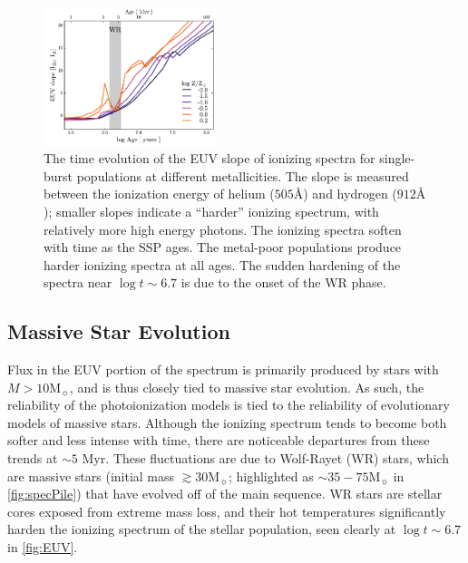 \documentclass[trackchanges, twocolumn, tighten]{aastex61}
\newcommand{\Fig}[1]{\autoref{fig:#1}}
\newcommand\Msun{\ensuremath{\mathrm{M_{\sun}}}}
\newcommand{\ang}{\ensuremath{\mbox{\AA}}}
\begin{document}
\begin{figure}
  \begin{centering}
    \includegraphics[width=0.45\textwidth]{f3.pdf}
    \caption{The time evolution of the EUV slope of ionizing spectra for single-burst populations at different metallicities. The slope is measured between the ionization energy of helium ($505\ang$) and hydrogen ($912\ang$); smaller slopes indicate a ``harder'' ionizing spectrum, with relatively more high energy photons. The ionizing spectra soften with time as the SSP ages. The metal-poor populations produce harder ionizing spectra at all ages. The sudden hardening of the spectra near $\log t \sim 6.7$ is due to the onset of the WR phase.}
    \label{fig:EUV}
  \end{centering}
\end{figure}

\subsection{Massive Star Evolution}\label{sec:spectra:stars}

Flux in the EUV portion of the spectrum is primarily produced by stars with $M > 10\Msun$, and is thus closely tied to massive star evolution. As such, the reliability of the photoionization models is tied to the reliability of evolutionary models of massive stars. Although the ionizing spectrum tends to become both softer and less intense with time, there are noticeable departures from these trends at ${\sim}5$ Myr. These fluctuations are due to Wolf-Rayet (WR) stars, which are massive stars (initial mass $\gtrsim 30\Msun$; highlighted as $\sim 35-75 \Msun$ in \Fig{specPile}) that have evolved off of the main sequence. WR stars are stellar cores exposed from extreme mass loss, and their hot temperatures significantly harden the ionizing spectrum of the stellar population, seen clearly at $\log t \sim 6.7$ in \Fig{EUV}.
\end{document}
